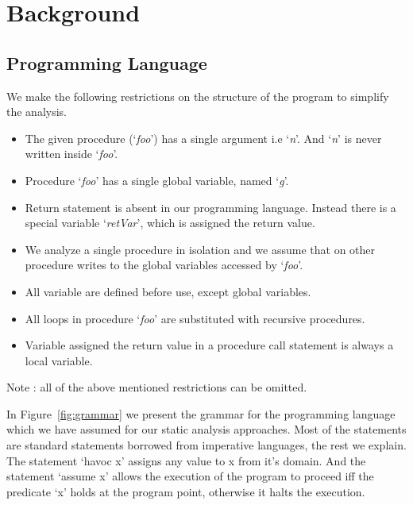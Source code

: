 \documentclass{llncs}
\newcommand{\foo}{\textit{foo}}
\newcommand{\retVar}{\textit{retVar}}
\newcommand{\n}{\textit{n}}
\newcommand{\g}{\textit{g}}
\begin{document}
\section{Background} \label{sec:background}

\subsection{Programming Language}
We make the following restrictions on the structure of the program to
simplify the analysis.

\begin{itemize}
\item The given procedure (`\foo') has a single argument i.e `\n'. And
  `\n' is never written inside `\foo'.
\item Procedure `\foo' has a single global variable, named `\g'.
\item Return statement is absent in our programming language. Instead
  there is a special variable `\retVar', which is assigned the return
  value.
\item We analyze a single procedure in isolation and we assume that on
  other procedure writes to the global variables accessed by `\foo'.
\item All variable are defined before use, except global variables.
\item All loops in procedure `\foo' are substituted with 
  recursive procedures.
\item Variable assigned the return value in a procedure call
  statement is always a local variable.
\end{itemize}
Note : all of the above mentioned restrictions can be omitted.

In Figure~\ref{fig:grammar} we present the grammar for the programming
language which we have assumed for our static analysis approaches.
Most of the statements are standard statements borrowed from
imperative languages, the rest we explain. The statement `havoc x'
assigns any value to x from it's domain. And the statement `assume x'
allows the execution of the program to proceed iff the predicate `x'
holds at the program point, otherwise it halts the execution.
\end{document}
